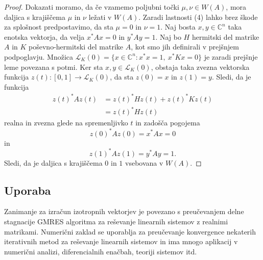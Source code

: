 \documentclass[12pt,a4paper]{amsart}
\theoremstyle{definition}
\theoremstyle{plain}
\newcommand{\LH}{\mathcal{L}}
\newcommand{\C}{\mathbb C}
\begin{document}
\begin{proof}
Dokazati moramo, da če vzamemo poljubni točki $\mu, \nu \in W(A)$,  mora daljica s krajiščema $\mu$ in $\nu$ ležati v $W(A)$. Zaradi lastnosti (4) lahko brez škode za splošnost predpostavimo, da sta $\mu=0$ in $\nu=1$. Naj bosta $x,y\in \C^n$ taka enotska vektorja, da velja $x^\ast Ax=0$ in $y^\ast Ay=1$. 
Naj bo $H$ hermitski del matrike $A$ in $K$ poševno-hermitski del matrike $A$, kot smo jih definirali v prejšnjem podpoglavju. Množica $\LH_{K}(0) =\{x\in \C^n\! : x^\ast x=1,\ x^\ast Kx=0\}$ je zaradi prejšnje leme povezana s potmi. Ker sta $x,y\in \LH_{K}(0)$, obstaja taka zvezna vektorska funkcija $z(t): [0,1] \rightarrow \LH_{K}(0)$, da sta $z(0)=x$ in $z(1)=y$.  Sledi, da je funkcija 
\begin{align*}
z(t)^\ast A z(t) &= z(t)^\ast Hz(t) +z(t)^\ast K z(t) \\
 &= z(t)^\ast Hz(t)
\end{align*}
realna in zvezna glede na spremenljivko $t$ in zadošča pogojema $$z(0)^\ast Az(0)=x^\ast Ax=0$$ in $$z(1)^\ast Az(1)=y^\ast Ay=1.$$ Sledi, da je daljica s krajiščema $0$ in $1$ vsebovana v $W(A)$.
\end{proof}

\subsection{Uporaba}
Zanimanje za izračun izotropnih vektorjev je povezano s pre\-u\-če\-va\-njem delne stagnacije GMRES algoritma za reševanje linearnih sistemov z realnimi matrikami. Numerični zaklad se uporablja za preučevanje konvergence nekaterih iterativnih metod za reševanje linearnih sistemov in ima mnogo aplikacij v numerični analizi, diferencialnih enačbah, teoriji sistemov itd.
\end{document}
